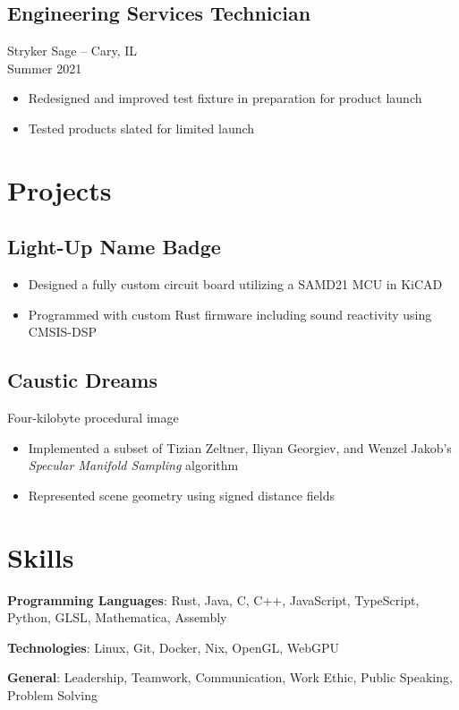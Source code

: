 \documentclass[letterpaper,10pt]{article}
\begin{document}
\subsection*{Engineering Services Technician}
Stryker Sage -- Cary, IL \\
Summer 2021

\begin{itemize}[topsep=0.5em, partopsep=0em, itemsep=0.1em]
    \item Redesigned and improved test fixture in preparation for product launch
    \item Tested products slated for limited launch
\end{itemize}

\section*{Projects}

\subsection*{Light-Up Name Badge}

\begin{itemize}[topsep=0.5em, partopsep=0em, itemsep=0.1em]
    \item Designed a fully custom circuit board utilizing a SAMD21 MCU in KiCAD
    \item Programmed with custom Rust firmware including sound reactivity using CMSIS-DSP
\end{itemize}

\subsection*{Caustic Dreams}
Four-kilobyte procedural image

\begin{itemize}[topsep=0.5em, partopsep=0em, itemsep=0.1em]
    \item Implemented a subset of Tizian Zeltner, Iliyan Georgiev, and Wenzel Jakob's \textit{Specular Manifold Sampling} algorithm
    \item Represented scene geometry using signed distance fields
\end{itemize}

\section*{Skills}

\textbf{Programming Languages}: Rust, Java, C, C++, JavaScript, TypeScript, Python, GLSL, Mathematica, Assembly

\medskip

\textbf{Technologies}: Linux, Git, Docker, Nix, OpenGL, WebGPU

\medskip

\textbf{General}: Leadership, Teamwork, Communication, Work Ethic, Public Speaking, Problem Solving
\end{document}

